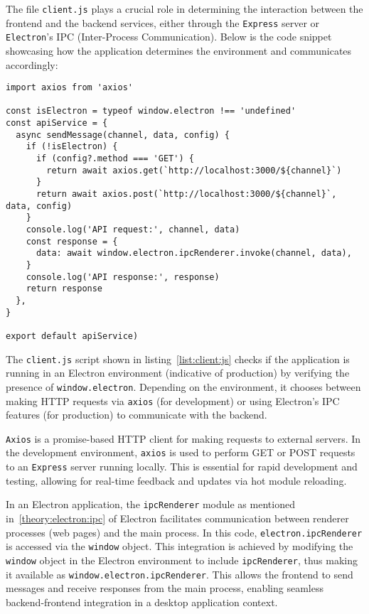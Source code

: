The file \texttt{client.js} plays a crucial role in determining the interaction between the frontend and the backend services, either through the \texttt{Express} server or \texttt{Electron}'s IPC (Inter-Process Communication). Below is the code snippet showcasing how the application determines the environment and communicates accordingly:

\begin{clisting}
\label{list:client:js}
\begin{verbatim}
import axios from 'axios'

const isElectron = typeof window.electron !== 'undefined'
const apiService = {
  async sendMessage(channel, data, config) {
    if (!isElectron) {
      if (config?.method === 'GET') {
        return await axios.get(`http://localhost:3000/${channel}`)
      }
      return await axios.post(`http://localhost:3000/${channel}`, data, config)
    }
    console.log('API request:', channel, data)
    const response = {
      data: await window.electron.ipcRenderer.invoke(channel, data),
    }
    console.log('API response:', response)
    return response
  },
}

export default apiService)
\end{verbatim}
\end{clisting}

The \texttt{client.js} script shown in listing~\ref{list:client:js} checks if the application is running in an Electron environment (indicative of production) by verifying the presence of \texttt{window.electron}. Depending on the environment, it chooses between making HTTP requests via \texttt{axios} (for development) or using Electron's IPC features (for production) to communicate with the backend.

\texttt{Axios} is a promise-based HTTP client for making requests to external servers. In the development environment, \texttt{axios} is used to perform GET or POST requests to an \texttt{Express} server running locally. This is essential for rapid development and testing, allowing for real-time feedback and updates via hot module reloading.

In an Electron application, the \texttt{ipcRenderer} module as mentioned in~\ref{theory:electron:ipc} of Electron facilitates communication between renderer processes (web pages) and the main process. In this code, \texttt{electron.ipcRenderer} is accessed via the \texttt{window} object. This integration is achieved by modifying the \texttt{window} object in the Electron environment to include \texttt{ipcRenderer}, thus making it available as \texttt{window.electron.ipcRenderer}. This allows the frontend to send messages and receive responses from the main process, enabling seamless backend-frontend integration in a desktop application context.


